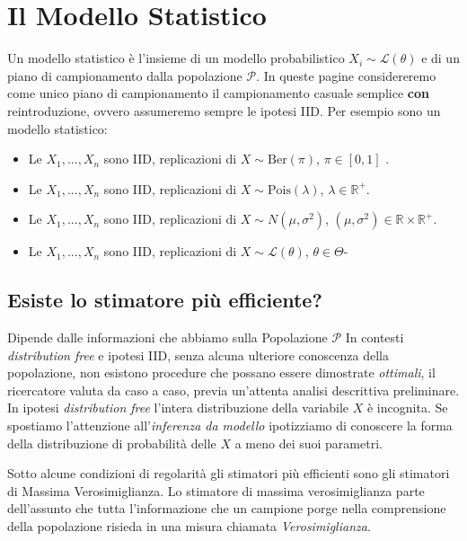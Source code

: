 \documentclass[
  11pt,
]{book}
\providecommand{\tightlist}{%
  \setlength{\itemsep}{0pt}\setlength{\parskip}{0pt}}
\theoremstyle{mytheoremstyle}
\theoremstyle{mydefstyle}
\begin{document}
\section{Il Modello Statistico}\label{il-modello-statistico}

Un modello statistico è l'insieme di un modello probabilistico \(X_i\sim\mathscr{L}(\theta)\)
e di un piano di campionamento dalla popolazione \(\mathscr{P}\).
In queste pagine considereremo come unico piano di campionamento il campionamento casuale semplice \textbf{con} reintroduzione, ovvero assumeremo sempre le ipotesi IID.
Per esempio sono un modello statistico:

\begin{itemize}
\tightlist
\item
  Le \(X_1,...,X_n\) sono IID, replicazioni di \(X\sim\text{Ber}(\pi)\), \(\pi\in[0,1]\) .
\item
  Le \(X_1,...,X_n\) sono IID, replicazioni di \(X\sim\text{Pois}(\lambda)\), \(\lambda\in\mathbb{R}^+\).
\item
  Le \(X_1,...,X_n\) sono IID, replicazioni di \(X\sim N(\mu,\sigma^2)\), \((\mu,\sigma^2)\in\mathbb{R}\times\mathbb{R}^+\).
\item
  Le \(X_1,...,X_n\) sono IID, replicazioni di \(X\sim \mathscr{L}(\theta)\), \(\theta\in\Theta\)-
\end{itemize}

\subsection{Esiste lo stimatore più efficiente?}\label{esiste-lo-stimatore-piuxf9-efficiente}

Dipende dalle informazioni che abbiamo sulla Popolazione \(\mathscr{P}\)
In contesti \emph{distribution free} e ipotesi IID, senza alcuna ulteriore conoscenza della popolazione, non esistono procedure che possano essere dimostrate \emph{ottimali}, il ricercatore valuta da caso a caso, previa un'attenta analisi descrittiva preliminare.
In ipotesi \emph{distribution free} l'intera distribuzione della variabile \(X\) è incognita.
Se spostiamo l'attenzione all'\emph{inferenza da modello} ipotizziamo di conoscere la forma della distribuzione di probabilità delle \(X\) a meno dei suoi parametri.

Sotto alcune condizioni di regolarità gli stimatori più efficienti sono gli stimatori di Massima Verosimiglianza.
Lo stimatore di massima verosimiglianza parte dell'assunto che tutta l'informazione che un campione
porge nella comprensione della popolazione risieda in una misura chiamata \emph{Verosimiglianza}.
\end{document}
